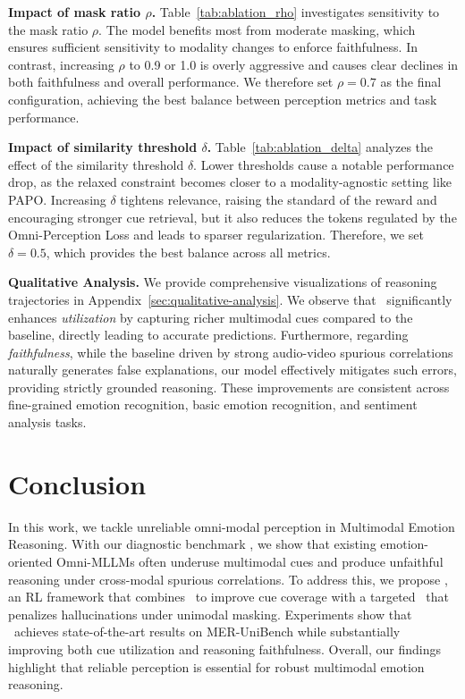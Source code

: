 \documentclass{article}
\theoremstyle{plain}
\theoremstyle{definition}
\theoremstyle{remark}
\begin{document}
    
    
    
    

\noindent\textbf{Impact of mask ratio $\rho$.}
Table~\ref{tab:ablation_rho} investigates sensitivity to the mask ratio $\rho$. The model benefits most from moderate masking, which ensures sufficient sensitivity to modality changes to enforce faithfulness. In contrast, increasing $\rho$ to 0.9 or 1.0 is overly aggressive and causes clear declines in both faithfulness and overall performance. We therefore set $\rho=0.7$ as the final configuration, achieving the best balance between perception metrics and task performance.


\noindent\textbf{Impact of similarity threshold $\delta$.}
Table~\ref{tab:ablation_delta} analyzes the effect of the similarity threshold $\delta$. Lower thresholds cause a notable performance drop, as the relaxed constraint becomes closer to a modality-agnostic setting like PAPO. Increasing $\delta$ tightens relevance, raising the standard of the reward and encouraging stronger cue retrieval, but it also reduces the tokens regulated by the Omni-Perception Loss and leads to sparser regularization. Therefore, we set $\delta=0.5$, which provides the best balance across all metrics.


\noindent\textbf{Qualitative Analysis.}
We provide comprehensive visualizations of reasoning trajectories in Appendix~\ref{sec:qualitative-analysis}. We observe that \ourmethod\ significantly enhances \textit{utilization} by capturing richer multimodal cues compared to the baseline, directly leading to accurate predictions. Furthermore, regarding \textit{faithfulness}, while the baseline driven by strong audio-video spurious correlations naturally generates false explanations, our model effectively mitigates such errors, providing strictly grounded reasoning. These improvements are consistent across fine-grained emotion recognition, basic emotion recognition, and sentiment analysis tasks.


\section{Conclusion} 
\label{sec:conclusion}



In this work, we tackle unreliable omni-modal perception in Multimodal Emotion Reasoning. With our diagnostic benchmark \ourbench, we show that existing emotion-oriented Omni-MLLMs often underuse multimodal cues and produce unfaithful reasoning under cross-modal spurious correlations. To address this, we propose \ourmethod, an RL framework that combines \ourreward\ to improve cue coverage with a targeted \ourloss\ that penalizes hallucinations under unimodal masking. Experiments show that \ourmethod\ achieves state-of-the-art results on MER-UniBench while substantially improving both cue utilization and reasoning faithfulness. Overall, our findings highlight that reliable perception is essential for robust multimodal emotion reasoning.
\end{document}
